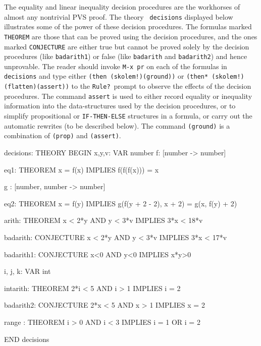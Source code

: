 The equality and linear inequality decision procedures are the
workhorses of almost any nontrivial PVS proof.  The theory {\tt
decisions} displayed below illustrates some of the power of these
decision procedures.  The formulas marked {\tt THEOREM} are those that
can be proved using the decision procedures, and the ones marked
{\tt CONJECTURE} are either true but cannot be proved solely by the
decision procedures (like {\tt badarith1}) or false (like {\tt badarith}
and {\tt badarith2}) and hence unprovable.  The reader should
invoke {\tt M-x pr} on each of the formulas in {\tt decisions} and
type either {\tt (then (skolem!)(ground))} or
{\tt (then* (skolem!)(flatten)(assert))} to the {\tt Rule?}\ prompt
to observe the effects of the decision procedures.  The command
{\tt assert} is used to either record equality or inequality information
into the data-structures used by the decision procedures, or to simplify
propositional or {\tt IF-THEN-ELSE} structures in a formula, or
carry out the automatic rewrites (to be described below).
The command {\tt (ground)} is a combination of {\tt (prop)} and {\tt (assert)}.

\begin{pvsscript}
decisions: THEORY
  BEGIN
   x,y,v: VAR number
   f: [number -> number]

   eq1: THEOREM x = f(x) IMPLIES f(f(f(x))) = x

   g : [number, number -> number]

   eq2: THEOREM x = f(y) IMPLIES g(f(y + 2 - 2), x + 2) = g(x, f(y) + 2)

   arith: THEOREM  %
     x < 2*y AND y < 3*v IMPLIES 3*x < 18*v

   badarith: CONJECTURE %
     x < 2*y AND y < 3*v IMPLIES 3*x < 17*v

   badarith1: CONJECTURE %
     x<0 AND y<0 IMPLIES x*y>0

   i, j, k: VAR int
 
   intarith: THEOREM %
     2*i < 5 AND i > 1 IMPLIES i = 2

   badarith2: CONJECTURE  %
     2*x < 5 AND x > 1 IMPLIES x = 2

   range : THEOREM  %
     i > 0 AND i < 3 IMPLIES i = 1 OR i = 2

  END decisions
\end{pvsscript}

